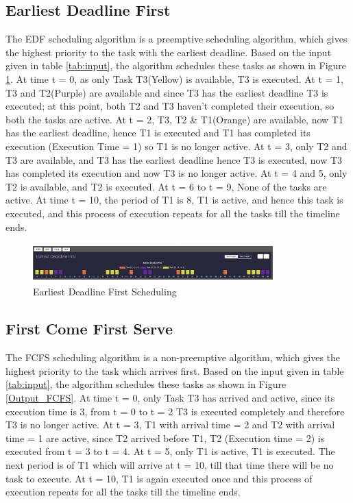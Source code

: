 \documentclass[12pt, conference]{IEEEtran}
\begin{document}
\subsection{Earliest Deadline First}
The EDF scheduling algorithm is a preemptive scheduling algorithm, which gives the highest priority to the task with the earliest deadline. Based on the input given in table \ref{tab:input}, the algorithm schedules these tasks as shown in Figure \ref{Output_EDF}. At time t = 0, as only Task T3(Yellow) is available, T3 is executed. At t = 1, T3 and T2(Purple) are available and since T3 has the earliest deadline T3 is executed; at this point, both T2 and T3 haven't completed their execution, so both the tasks are active. At t = 2, T3, T2 \& T1(Orange) are available, now T1 has the earliest deadline, hence T1 is executed and T1 has completed its execution (Execution Time = 1) so T1 is no longer active. At t = 3, only T2 and T3 are available, and T3 has the earliest deadline hence T3 is executed, now T3 has completed its execution and now T3 is no longer active. At t = 4 and 5, only T2 is available, and T2 is executed. At t = 6 to t = 9, None of the tasks are active. At time t = 10, the period of T1 is 8, T1 is active, and hence this task is executed, and this process of execution repeats for all the tasks till the timeline ends.
\begin{figure}
\centerline{\includegraphics[width=9.25cm, height=1.5cm]{Output_EDF.png}}
\caption{Earliest Deadline First Scheduling}
\label{Output_EDF}
\end{figure} 


\subsection{First Come First Serve}
The FCFS scheduling algorithm is a non-preemptive algorithm, which gives the highest priority to the task which arrives first. Based on the input given in table \ref{tab:input}, the algorithm schedules these tasks as shown in Figure \ref{Output_FCFS}. At time t = 0, only Task T3 has arrived and active, since its execution time is 3, from t = 0 to t = 2 T3 is executed completely and therefore T3 is no longer active. At t = 3, T1 with arrival time = 2 and T2 with arrival time = 1 are active, since T2 arrived before T1, T2 (Execution time = 2) is executed from t = 3 to t = 4. At t = 5, only T1 is active, T1 is executed. The next period is of T1 which will arrive at t = 10, till that time there will be no task to execute. At t = 10, T1 is again executed once and this process of execution repeats for all the tasks till the timeline ends.
\end{document}
